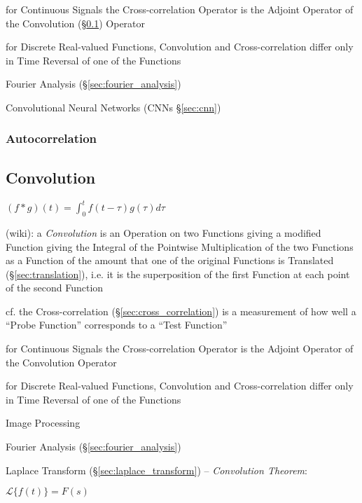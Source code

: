 for Continuous Signals the Cross-correlation Operator is the Adjoint Operator
of the Convolution (\S\ref{sec:convolution}) Operator

for Discrete Real-valued Functions, Convolution and Cross-correlation differ
only in Time Reversal of one of the Functions

\fist Fourier Analysis (\S\ref{sec:fourier_analysis})

\fist Convolutional Neural Networks (CNNs \S\ref{sec:cnn})



\subsubsection{Autocorrelation}\label{sec:autocorrelation}



\subsection{Convolution}\label{sec:convolution}

$(f * g)(t) = \int_0^t f(t-\tau) g(\tau) d\tau$

(wiki): a \emph{Convolution} is an Operation on two Functions giving a modified
Function giving the Integral of the Pointwise Multiplication of the two
Functions as a Function of the amount that one of the original Functions is
Translated (\S\ref{sec:translation}), i.e. it is the superposition of the first
Function at each point of the second Function

cf. the Cross-correlation (\S\ref{sec:cross_correlation}) is a measurement of
how well a ``Probe Function'' corresponds to a ``Test Function''

for Continuous Signals the Cross-correlation Operator is the Adjoint Operator of
the Convolution Operator

for Discrete Real-valued Functions, Convolution and Cross-correlation differ
only in Time Reversal of one of the Functions

Image Processing

\fist Fourier Analysis (\S\ref{sec:fourier_analysis})

Laplace Transform (\S\ref{sec:laplace_transform}) -- \emph{Convolution Theorem}:

$\mathcal{L}\{f(t)\} = F(s)$


